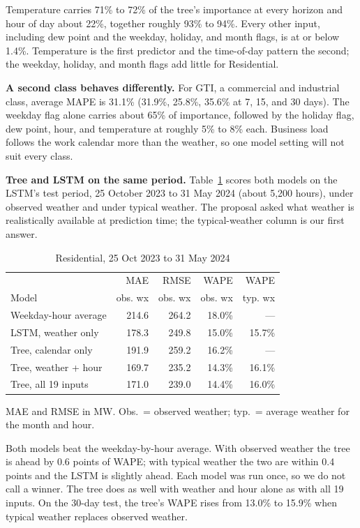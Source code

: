 \documentclass[conference]{IEEEtran}
\begin{document}
Temperature carries 71\% to 72\% of the tree's importance at every horizon and hour of day about 22\%, together roughly 93\% to 94\%. Every other input, including dew point and the weekday, holiday, and month flags, is at or below 1.4\%. Temperature is the first predictor and the time-of-day pattern the second; the weekday, holiday, and month flags add little for Residential.

\textbf{A second class behaves differently.} For GTI, a commercial and industrial class, average MAPE is 31.1\% (31.9\%, 25.8\%, 35.6\% at 7, 15, and 30 days). The weekday flag alone carries about 65\% of importance, followed by the holiday flag, dew point, hour, and temperature at roughly 5\% to 8\% each. Business load follows the work calendar more than the weather, so one model setting will not suit every class.

\textbf{Tree and LSTM on the same period.} Table~\ref{tab:compare} scores both models on the LSTM's test period, 25 October 2023 to 31 May 2024 (about 5,200 hours), under observed weather and under typical weather. The proposal asked what weather is realistically available at prediction time; the typical-weather column is our first answer.

\begin{table}[t]
\caption{Residential, 25 Oct 2023 to 31 May 2024}
\label{tab:compare}
\centering\footnotesize
\setlength{\tabcolsep}{3pt}
\begin{tabular}{@{}lrrrr@{}}
\toprule
 & MAE & RMSE & WAPE & WAPE \\
Model & obs. wx & obs. wx & obs. wx & typ. wx \\
\midrule
Weekday-hour average & 214.6 & 264.2 & 18.0\% & --- \\
LSTM, weather only & 178.3 & 249.8 & 15.0\% & 15.7\% \\
Tree, calendar only & 191.9 & 259.2 & 16.2\% & --- \\
Tree, weather + hour & 169.7 & 235.2 & 14.3\% & 16.1\% \\
Tree, all 19 inputs & 171.0 & 239.0 & 14.4\% & 16.0\% \\
\bottomrule
\end{tabular}
\par\smallskip\noindent MAE and RMSE in MW. Obs.\ = observed weather; typ.\ = average weather for the month and hour.
\end{table}

Both models beat the weekday-by-hour average. With observed weather the tree is ahead by 0.6 points of WAPE; with typical weather the two are within 0.4 points and the LSTM is slightly ahead. Each model was run once, so we do not call a winner. The tree does as well with weather and hour alone as with all 19 inputs. On the 30-day test, the tree's WAPE rises from 13.0\% to 15.9\% when typical weather replaces observed weather.
\end{document}
